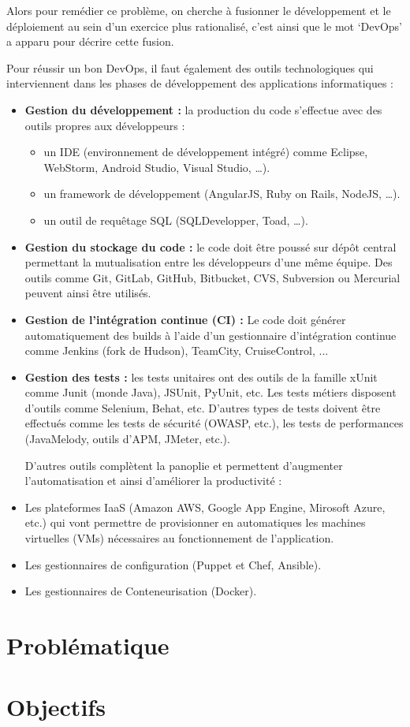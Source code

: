 Alors pour remédier ce problème, on cherche à fusionner le développement et le déploiement au sein d'un exercice plus rationalisé, c’est ainsi que le mot ‘DevOps’ a apparu pour décrire cette fusion.
\newline

Pour réussir un bon DevOps, il faut également des outils technologiques qui interviennent dans les phases de développement des applications informatiques :

\begin{itemize}
\item \textbf {Gestion du développement :} la production du code s’effectue avec des outils propres aux développeurs :
\begin{itemize}
\item un IDE (environnement de développement intégré) comme Eclipse, WebStorm, Android Studio, Visual Studio, …).
\item un framework de développement (AngularJS, Ruby on Rails,  NodeJS, …).
\item un outil de requêtage SQL (SQLDevelopper, Toad, …). 
\end{itemize}

\item \textbf {Gestion du stockage du code :} le code doit être poussé sur dépôt central permettant la mutualisation entre les développeurs d’une même équipe. Des outils comme Git, GitLab, GitHub, Bitbucket, CVS, Subversion ou Mercurial peuvent ainsi être utilisés.


\item \textbf {Gestion de l’intégration continue (CI) :} Le code doit générer automatiquement des builds à l’aide d’un gestionnaire d’intégration continue comme Jenkins\cite{jenkinsEssentials} (fork de Hudson), TeamCity, CruiseControl, ...


\item \textbf {Gestion des tests :} les tests unitaires ont des outils de la famille xUnit comme Junit (monde Java), JSUnit, PyUnit, etc. Les tests métiers disposent d’outils comme Selenium, Behat, etc. D’autres types de tests doivent être effectués comme les tests de sécurité (OWASP, etc.), les tests de performances (JavaMelody, outils d’APM, JMeter, etc.).
\newline

D’autres outils complètent la panoplie et permettent d’augmenter l’automatisation et ainsi d’améliorer la productivité :

\item Les plateformes IaaS (Amazon AWS, Google App Engine, Mirosoft Azure, etc.) qui vont permettre de provisionner en automatiques les machines virtuelles (VMs) nécessaires au fonctionnement de l’application.
\item Les gestionnaires de configuration (Puppet et Chef, Ansible).
\item Les gestionnaires de Conteneurisation (Docker\cite{proDocker}\cite{usingDocker}).
\end{itemize}

\section{Problématique}

\section {Objectifs}